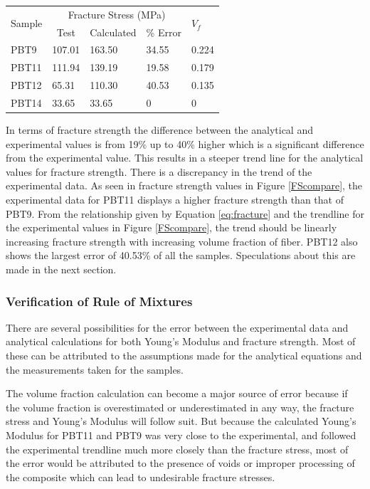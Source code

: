 \documentclass[11pt]{article}
\begin{document}
\onehalfspacing
\begin{center}
 \label{tab:ComparingFracture}
\begin{tabular}{p{1.25cm} ||  p{1.5cm} | p{1.5cm} | p{1.5cm} | p{1cm}}
\hline
 \multirow{2}{*}{Sample} & \multicolumn{3}{c|}{Fracture Stress (MPa)} & \multirow{2}{*}{\(V_f\)} \\
   &  \multicolumn{1}{c}{Test} & \multicolumn{1}{c}{Calculated} & \multicolumn{1}{c|}{\% Error} &\\
\hline
PBT9 & 107.01 & 163.50 & 34.55 & 0.224\\
PBT11 &  111.94 & 139.19 & 19.58 & 0.179\\
PBT12 &  65.31 & 110.30 & 40.53 & 0.135 \\
PBT14 & 33.65 & 33.65 & 0 & 0\\
\hline
\end{tabular}
\end{center}
\singlespacing

In terms of fracture strength the difference between the analytical and experimental values is from 19\% up to 40\% higher which is a significant difference from the experimental value. This results in a steeper trend line for the analytical values for fracture strength. There is a discrepancy in the trend of the experimental data. As seen in fracture strength values in Figure \ref{FScompare}, the experimental data for PBT11 displays a higher fracture strength than that of PBT9. From the relationship given by Equation \ref{eq:fracture} and the trendline for the experimental values in Figure \ref{FScompare}, the trend should be linearly increasing fracture strength with increasing volume fraction of fiber. PBT12 also shows the largest error of 40.53\% of all the samples. Speculations about this are made in the next section.
\singlespacing

\subsubsection{Verification of Rule of Mixtures}

There are several possibilities for the error between the experimental data and analytical calculations for both Young's Modulus and fracture strength. Most of these can be attributed to the assumptions made for the analytical equations and the measurements taken for the samples.

The volume fraction calculation can become a major source of error because if the volume fraction is overestimated or underestimated in any way, the fracture stress and Young's Modulus will follow suit. But because the calculated Young's Modulus for PBT11 and PBT9 was very close to the experimental, and followed the experimental trendline much more closely than the fracture stress, most of the error would be attributed to the presence of voids or improper processing of the composite which can lead to undesirable fracture stresses.
\end{document}
